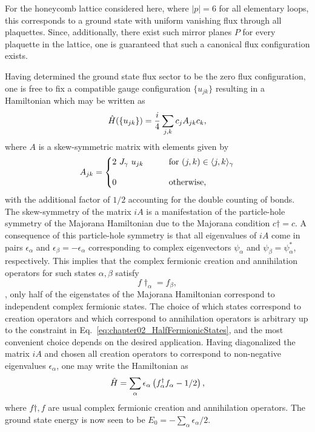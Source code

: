 For the honeycomb lattice considered here, where $|p| = 6$ for all elementary loops, this corresponds to a ground state with uniform vanishing flux through all plaquettes.
Since, additionally, there exist such mirror planes $P$ for every plaquette in the lattice, one is guaranteed that such a canonical flux configuration exists.

Having determined the ground state flux sector to be the zero flux configuration, one is free to fix a compatible gauge configuration $\{u_{jk}\}$ resulting in a Hamiltonian which may be written as
%
\begin{equation}
	\hat{H}(\{u_{jk}\}) = \frac{i}{4} \sum_{j,k} c_j A_{jk} c_k,
	\label{eq:chapter02_KitaevHamiltonianAMatrix}
\end{equation}
%
where $A$ is a skew-symmetric matrix with elements given by
%
\begin{equation}
	A_{jk} = \left\{
	\begin{matrix*}[l]
		2~J_{\gamma}~u_{jk} &
		\qquad \text{for $(j,k) \in \avg{j,k}_{\gamma}$}\\
		&\\
		0 &
		\qquad \text{otherwise,}
	\end{matrix*}
	\right.
\end{equation}
%
with the additional factor of $1/2$ accounting for the double counting of bonds.
The skew-symmetry of the matrix $iA$ is a manifestation of the particle-hole symmetry of the Majorana Hamiltonian due to the Majorana condition $c\dag = c$.
A consequence of this particle-hole symmetry is that all eigenvalues of $iA$ come in pairs $\epsilon_{\alpha}$ and $\epsilon_{\beta} = -\epsilon_{\alpha}$ corresponding to complex eigenvectors $\psi_{\alpha}$ and $\psi_{\beta} = \psi^*_{\alpha}$, respectively.
This implies that the complex fermionic creation and annihilation operators for such states $\alpha, \beta$ satisfy
%
\begin{equation}
	f\dag_{\alpha} = f_{\beta},
	\label{eq:chapter02_HalfFermionicStates}
\end{equation}
\ie, only half of the eigenstates of the Majorana Hamiltonian correspond to independent complex fermionic states.
The choice of which states correspond to creation operators and which correspond to annihilation operators is arbitrary up to the constraint in Eq.~\eqref{eq:chapter02_HalfFermionicStates}, and the most convenient choice depends on the desired application.
Having diagonalized the matrix $iA$ and chosen all creation operators to correspond to non-negative eigenvalues $\epsilon_{\alpha}$, one may write the Hamiltonian as
%
\begin{equation}
	\hat{H} = \sum_{\alpha} \epsilon_{\alpha} \left(f^{\dagger}_{\alpha} f_{\alpha} - 1/2\right),
	\label{eq:chapter02_KitaevHamiltonianDiagonal}
\end{equation}
%
where $f\dag, f$ are usual complex fermionic creation and annihilation operators.
The ground state energy is now seen to be $E_0 = -\sum_{\alpha} \epsilon_{\alpha}/2$.

